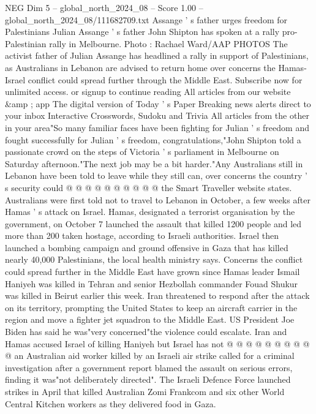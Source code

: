 \begin{textsample}{NEG Dim 5 – global\_north\_2024\_08 – Score 1.00 – global\_north\_2024\_08/111682709.txt}  \label{ex:f5_neg_079}
Assange ' s father urges freedom for Palestinians Julian Assange ' s father John Shipton has spoken at a rally pro-Palestinian rally in Melbourne.
Photo : Rachael Ward/AAP PHOTOS The activist father of Julian Assange has headlined a rally in support of Palestinians, as Australians in Lebanon are advised to return home over concerns the Hamas-Israel conflict could spread further through the Middle East.
Subscribe now for unlimited access. or signup to continue reading All articles from our website \&amp ; app The digital version of Today ' s Paper Breaking news alerts direct to your inbox Interactive Crosswords, Sudoku and Trivia All articles from the other in your area"So many familiar faces have been fighting for Julian ' s freedom and fought successfully for Julian ' s freedom, congratulations,"John Shipton told a passionate crowd on the steps of Victoria ' s parliament in Melbourne on Saturday afternoon."The next job may be a bit harder."Any Australians still in Lebanon have been told to leave while they still can, over concerns the country ' s security could @ @ @ @ @ @ @ @ @ @ the Smart Traveller website states.
Australians were first told not to travel to Lebanon in October, a few weeks after Hamas ' s attack on Israel.
Hamas, designated a terrorist organisation by the government, on October 7 launched the assault that killed 1200 people and led more than 200 taken hostage, according to Israeli authorities.
Israel then launched a bombing campaign and ground offensive in Gaza that has killed nearly 40,000 Palestinians, the local health ministry says.
Concerns the conflict could spread further in the Middle East have grown since Hamas leader Ismail Haniyeh was killed in Tehran and senior Hezbollah commander Fouad Shukur was killed in Beirut earlier this week.
Iran threatened to respond after the attack on its territory, prompting the United States to keep an aircraft carrier in the region and move a fighter jet squadron to the Middle East.
US President Joe Biden has said he was"very concerned"the violence could escalate.
Iran and Hamas accused Israel of killing Haniyeh but Israel has not @ @ @ @ @ @ @ @ @ @ an Australian aid worker killed by an Israeli air strike called for a criminal investigation after a government report blamed the assault on serious errors, finding it was"not deliberately directed".
The Israeli Defence Force launched strikes in April that killed Australian Zomi Frankcom and six other World Central Kitchen workers as they delivered food in Gaza.

\end{textsample}
